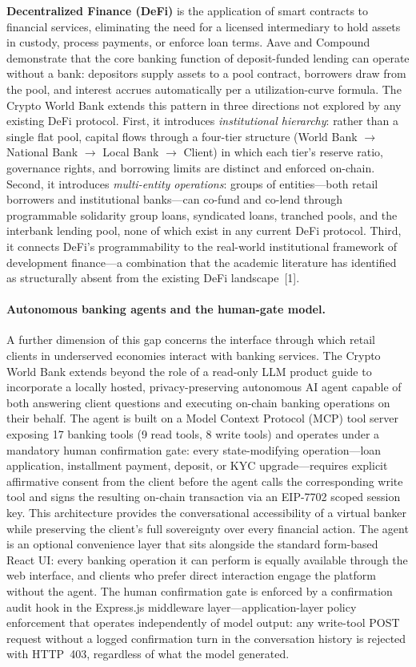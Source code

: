 \documentclass[12pt,a4paper]{report}
\begin{document}
\textbf{Decentralized Finance (DeFi)} is the application of smart contracts to financial services, eliminating the need for a licensed intermediary to hold assets in custody, process payments, or enforce loan terms. Aave and Compound demonstrate that the core banking function of deposit-funded lending can operate without a bank: depositors supply assets to a pool contract, borrowers draw from the pool, and interest accrues automatically per a utilization-curve formula. The Crypto World Bank extends this pattern in three directions not explored by any existing DeFi protocol. First, it introduces \textit{institutional hierarchy}: rather than a single flat pool, capital flows through a four-tier structure (World Bank $\to$ National Bank $\to$ Local Bank $\to$ Client) in which each tier's reserve ratio, governance rights, and borrowing limits are distinct and enforced on-chain. Second, it introduces \textit{multi-entity operations}: groups of entities---both retail borrowers and institutional banks---can co-fund and co-lend through programmable solidarity group loans, syndicated loans, tranched pools, and the interbank lending pool, none of which exist in any current DeFi protocol. Third, it connects DeFi's programmability to the real-world institutional framework of development finance---a combination that the academic literature has identified as structurally absent from the existing DeFi landscape~[1].

\paragraph{Autonomous banking agents and the human-gate model.}
A further dimension of this gap concerns the interface through which retail clients in underserved economies interact with banking services. The Crypto World Bank extends beyond the role of a read-only LLM product guide to incorporate a locally hosted, privacy-preserving autonomous AI agent capable of both answering client questions and executing on-chain banking operations on their behalf. The agent is built on a Model Context Protocol (MCP) tool server exposing 17 banking tools (9 read tools, 8 write tools) and operates under a mandatory human confirmation gate: every state-modifying operation---loan application, installment payment, deposit, or KYC upgrade---requires explicit affirmative consent from the client before the agent calls the corresponding write tool and signs the resulting on-chain transaction via an EIP-7702 scoped session key. This architecture provides the conversational accessibility of a virtual banker while preserving the client's full sovereignty over every financial action. The agent is an optional convenience layer that sits alongside the standard form-based React UI: every banking operation it can perform is equally available through the web interface, and clients who prefer direct interaction engage the platform without the agent. The human confirmation gate is enforced by a confirmation audit hook in the Express.js middleware layer---application-layer policy enforcement that operates independently of model output: any write-tool POST request without a logged confirmation turn in the conversation history is rejected with HTTP~403, regardless of what the model generated.
\end{document}
